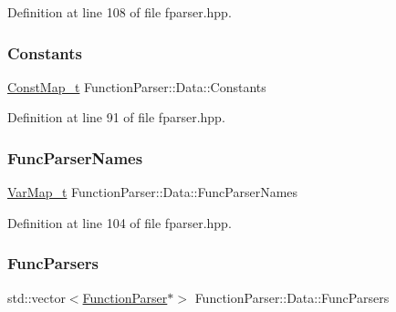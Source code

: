 Definition at line 108 of file fparser.\+hpp.

\mbox{\label{struct_function_parser_1_1_data_a832899b555441fe2ce6bfaf5e0c19f6d}} 
\subsubsection{\texorpdfstring{Constants}{Constants}}
{\footnotesize\ttfamily \hyperlink{struct_function_parser_1_1_data_a74ff90f5d1687b68363d1602ef0ccece}{Const\+Map\+\_\+t} Function\+Parser\+::\+Data\+::\+Constants}



Definition at line 91 of file fparser.\+hpp.

\mbox{\label{struct_function_parser_1_1_data_ac552328a6854b174a7d085d9df0c8943}} 
\subsubsection{\texorpdfstring{Func\+Parser\+Names}{FuncParserNames}}
{\footnotesize\ttfamily \hyperlink{struct_function_parser_1_1_data_a02f3fbca3164d0e498312b418258ea84}{Var\+Map\+\_\+t} Function\+Parser\+::\+Data\+::\+Func\+Parser\+Names}



Definition at line 104 of file fparser.\+hpp.

\mbox{\label{struct_function_parser_1_1_data_a29d036708b0524b8ff0ddd3e6248ef6f}} 
\subsubsection{\texorpdfstring{Func\+Parsers}{FuncParsers}}
{\footnotesize\ttfamily std\+::vector$<$\hyperlink{class_function_parser}{Function\+Parser}$\ast$$>$ Function\+Parser\+::\+Data\+::\+Func\+Parsers}



